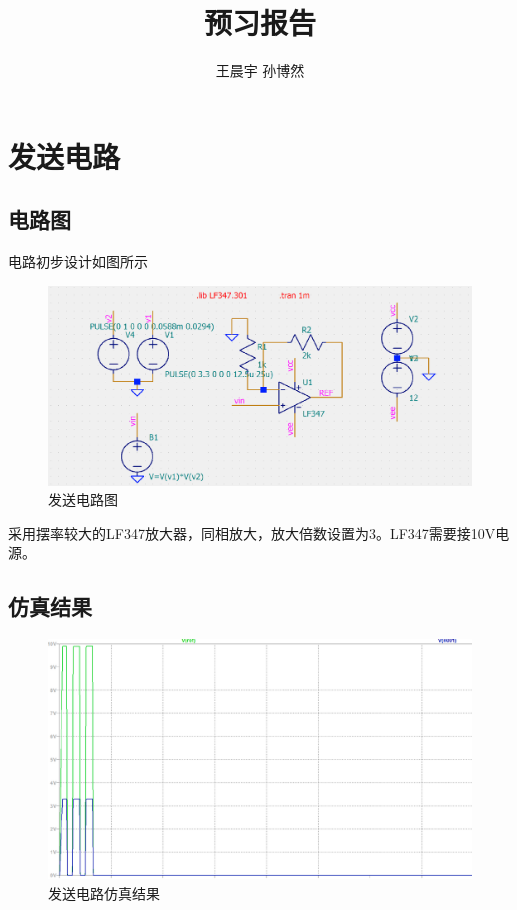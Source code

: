 \documentclass{article}
\title{预习报告}
\author{王晨宇 孙博然}
\begin{document}
\maketitle

\section{发送电路}
\subsection{电路图}
电路初步设计如图所示
\begin{figure}[H]
    \centering
    \includegraphics[width = 12cm]{images/tx_cir.png}
    \caption{发送电路图}\label{fig1}
\end{figure}
采用摆率较大的LF347放大器，同相放大，放大倍数设置为3。LF347需要接10V电源。
\subsection{仿真结果}
\begin{figure}[H]
    \centering
    \includegraphics[width = 12cm]{images/tx_waveform.png}
    \caption{发送电路仿真结果}\label{fig2}
\end{figure}
\end{document}
